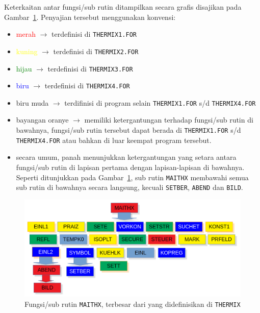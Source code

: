 \documentclass[a4paper,11pt]{report}
\renewcommand{\figurename}{Gambar}
\begin{document}
Keterkaitan antar fungsi/sub rutin ditampilkan secara grafis disajikan pada \figurename~\ref{fig:maithx}. Penyajian tersebut menggunakan konvensi:
\begin{itemize}
  \item \textcolor{red}{merah} $\rightarrow$ terdefinisi di \texttt{THERMIX1.FOR}
  \item \textcolor{yellow}{kuning} $\rightarrow$ terdefinisi di \texttt{THERMIX2.FOR}
  \item \textcolor{green}{hijau} $\rightarrow$ terdefinisi di \texttt{THERMIX3.FOR}
  \item \textcolor{blue}{biru} $\rightarrow$ terdefinisi di \texttt{THERMIX4.FOR}
  \item \textcolor{biruMuda}{biru muda} $\rightarrow$ terdifinisi di program selain \texttt{THERMIX1.FOR} s/d \texttt{THERMIX4.FOR}
  \item bayangan \textcolor{amber}{oranye} $\rightarrow$ memiliki ketergantungan terhadap fungsi/sub rutin di bawahnya, fungsi/sub rutin tersebut dapat berada di \texttt{THERMIX1.FOR} s/d \texttt{THERMIX4.FOR} atau bahkan di luar keempat program tersebut.
  \item secara umum, panah menunjukkan ketergantungan yang setara antara fungsi/sub rutin di lapisan pertama dengan lapisan-lapisan di bawahnya. Seperti ditunjukkan pada \figurename~\ref{fig:maithx}, sub rutin \texttt{MAITHX} membawahi semua sub rutin di bawahnya secara langsung, kecuali \texttt{SETBER}, \texttt{ABEND} dan \texttt{BILD}.
\end{itemize}

\begin{figure}
  \begin{center}
    \includegraphics[scale=.5]{../maithx.png}
    \caption{Fungsi/sub rutin \texttt{MAITHX}, terbesar dari yang didefinisikan di \texttt{THERMIX}}
    \label{fig:maithx}
  \end{center}
\end{figure}
\end{document}
